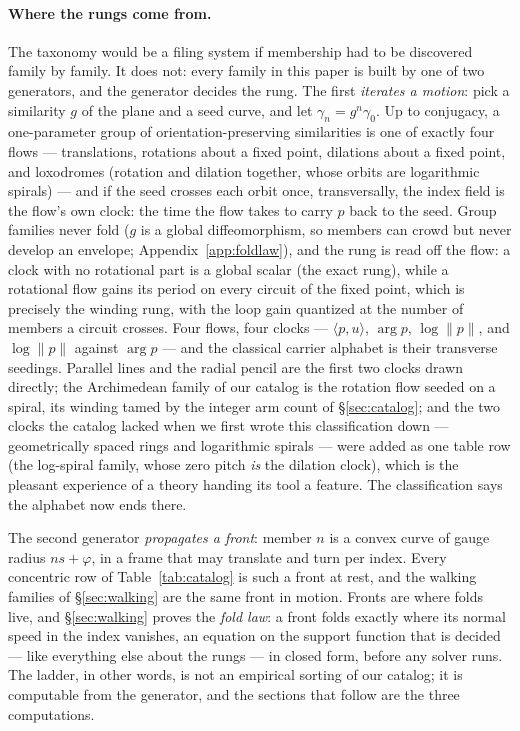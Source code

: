 \paragraph{Where the rungs come from.} The taxonomy would be a filing system
if membership had to be discovered family by family. It does not: every
family in this paper is built by one of two generators, and the generator
decides the rung. The first \emph{iterates a motion}: pick a similarity $g$
of the plane and a seed curve, and let $\gamma_n=g^n\gamma_0$. Up to
conjugacy, a one-parameter group of orientation-preserving similarities is
one of exactly four flows --- translations, rotations about a fixed point,
dilations about a fixed point, and loxodromes (rotation and dilation
together, whose orbits are logarithmic spirals) --- and if the seed crosses
each orbit once, transversally, the index field is the flow's own clock: the
time the flow takes to carry $p$ back to the seed. Group families never fold
($g$ is a global diffeomorphism, so members can crowd but never develop an
envelope; Appendix~\ref{app:foldlaw}), and the rung is read off the flow: a
clock with no rotational part is a global scalar (the exact rung), while a
rotational flow gains its period on every circuit of the fixed point, which
is precisely the winding rung, with the loop gain quantized at the number of
members a circuit crosses. Four flows, four clocks --- $\langle p,u\rangle$,
$\arg p$, $\log\lVert p\rVert$, and $\log\lVert p\rVert$ against $\arg p$ ---
and the classical carrier alphabet is their transverse seedings. Parallel
lines and the radial pencil are the first two clocks drawn directly; the
Archimedean family of our catalog is the rotation flow seeded on a spiral,
its winding tamed by the integer arm count of \S\ref{sec:catalog}; and the
two clocks the catalog lacked when we first wrote this classification down
--- geometrically spaced rings and logarithmic spirals --- were added as one
table row (the log-spiral family, whose zero pitch \emph{is} the dilation
clock), which is the pleasant experience of a theory handing its tool a
feature. The classification says the alphabet now ends there.

The second generator \emph{propagates a front}: member $n$ is a convex curve
of gauge radius $ns+\varphi$, in a frame that may translate and turn per
index. Every concentric row of Table~\ref{tab:catalog} is such a front at
rest, and the walking families of \S\ref{sec:walking} are the same front in
motion. Fronts are where folds live, and \S\ref{sec:walking} proves the
\emph{fold law}: a front folds exactly where its normal speed in the index
vanishes, an equation on the support function that is decided --- like
everything else about the rungs --- in closed form, before any solver runs.
The ladder, in other words, is not an empirical sorting of our catalog; it is
computable from the generator, and the sections that follow are the three
computations.

